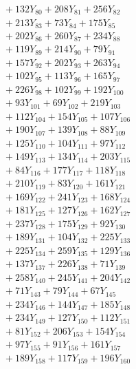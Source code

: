 \documentclass[a4paper,10pt]{article}
\begin{document}
{\begin{align}
&\;  + 132 Y_{80} + 208 Y_{81} + 256 Y_{82} \\[0.3ex]
&\;  + 213 Y_{83} + 73 Y_{84} + 175 Y_{85} \\[0.3ex]
&\;  + 202 Y_{86} + 260 Y_{87} + 234 Y_{88} \\[0.5ex]\allowbreak
&\;  + 119 Y_{89} + 214 Y_{90} + 79 Y_{91} \\[0.3ex]
&\;  + 157 Y_{92} + 202 Y_{93} + 263 Y_{94} \\[0.3ex]
&\;  + 102 Y_{95} + 113 Y_{96} + 165 Y_{97} \\[0.3ex]
&\;  + 226 Y_{98} + 102 Y_{99} + 192 Y_{100} \\[0.3ex]
&\;  + 93 Y_{101} + 69 Y_{102} + 219 Y_{103} \\[0.3ex]
&\;  + 112 Y_{104} + 154 Y_{105} + 107 Y_{106} \\[0.3ex]
&\;  + 190 Y_{107} + 139 Y_{108} + 88 Y_{109} \\[0.3ex]
&\;  + 125 Y_{110} + 104 Y_{111} + 97 Y_{112} \\[0.3ex]
&\;  + 149 Y_{113} + 134 Y_{114} + 203 Y_{115} \\[0.3ex]
&\;  + 84 Y_{116} + 177 Y_{117} + 118 Y_{118} \\[0.5ex]\allowbreak
&\;  + 210 Y_{119} + 83 Y_{120} + 161 Y_{121} \\[0.3ex]
&\;  + 169 Y_{122} + 241 Y_{123} + 168 Y_{124} \\[0.3ex]
&\;  + 181 Y_{125} + 127 Y_{126} + 162 Y_{127} \\[0.3ex]
&\;  + 237 Y_{128} + 175 Y_{129} + 92 Y_{130} \\[0.3ex]
&\;  + 189 Y_{131} + 104 Y_{132} + 225 Y_{133} \\[0.3ex]
&\;  + 225 Y_{134} + 259 Y_{135} + 129 Y_{136} \\[0.3ex]
&\;  + 137 Y_{137} + 226 Y_{138} + 71 Y_{139} \\[0.3ex]
&\;  + 258 Y_{140} + 245 Y_{141} + 204 Y_{142} \\[0.3ex]
&\;  + 71 Y_{143} + 79 Y_{144} + 67 Y_{145} \\[0.3ex]
&\;  + 234 Y_{146} + 144 Y_{147} + 185 Y_{148} \\[0.5ex]\allowbreak
&\;  + 234 Y_{149} + 127 Y_{150} + 112 Y_{151} \\[0.3ex]
&\;  + 81 Y_{152} + 206 Y_{153} + 154 Y_{154} \\[0.3ex]
&\;  + 97 Y_{155} + 91 Y_{156} + 161 Y_{157} \\[0.3ex]
&\;  + 189 Y_{158} + 117 Y_{159} + 196 Y_{160} \\[0.3ex]

\end{align}}
\end{document}
